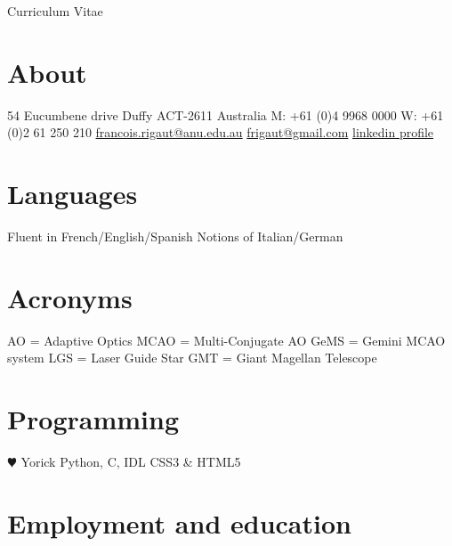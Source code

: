 \documentclass[]{friggeri-cv}
\begin{document}
       {Curriculum Vitae}

\begin{aside}
  \section{About}
    54 Eucumbene drive
    Duffy ACT-2611
    Australia
    M: +61 (0)4 9968 0000
    W: +61 (0)2 61 250 210
    \href{mailto:francois.rigaut@anu.edu.au}{francois.rigaut@anu.edu.au}
    \href{mailto:frigaut@gmail.com}{frigaut@gmail.com}
    \href{http://www.linkedin.com/profile/view?id=147884997}{linkedin profile}
  \section{Languages}
    Fluent in French/English/Spanish
    Notions of Italian/German
  \section{Acronyms}
    {\small AO = Adaptive Optics}
    {\small MCAO = Multi-Conjugate AO}
    {\small GeMS = Gemini MCAO system}
    {\small LGS = Laser Guide Star}
    {\small GMT = Giant Magellan Telescope}
  \section{Programming}
    {\color{red} $\varheartsuit$} Yorick
    Python, C, IDL
    CSS3 \& HTML5
\end{aside}


\section{Employment and education}
\end{document}
